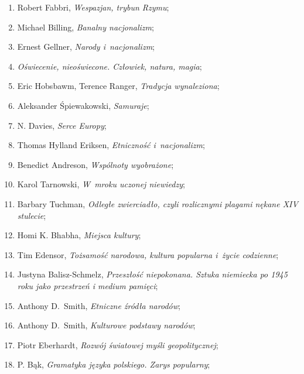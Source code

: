 \documentclass[a4paper,11pt]{article}
\begin{document}
\begin{enumerate}
\item Robert Fabbri, \emph{Wespazjan, trybun Rzymu};

\item Michael Billing, \emph{Banalny nacjonalizm};

\item Ernest Gellner, \emph{Narody i~nacjonalizm};

\item \emph{Oświecenie, nieoświecone. Człowiek, natura, magia};

\item Eric Hobsbawm, Terence Ranger, \emph{Tradycja wynaleziona};

\item Aleksander Śpiewakowski, \emph{Samuraje};

\item N. Davies, \emph{Serce Europy};

\item Thomas Hylland Eriksen, \emph{Etniczność i~nacjonalizm};

\item Benedict Andreson, \emph{Wspólnoty wyobrażone};

\item Karol Tarnowski, \emph{W~mroku uczonej niewiedzy};

\item Barbary Tuchman, \emph{Odległe zwierciadło, czyli rozlicznymi
    plagami nękane XIV stulecie};

\item Homi K. Bhabha, \emph{Miejsca kultury};

\item Tim Edensor, \emph{Tożsamość narodowa, kultura popularna i~życie
    codzienne};

\item Justyna Balisz-Schmelz, \emph{Przeszłość niepokonana. Sztuka
    niemiecka po 1945 roku jako przestrzeń i medium pamięci};

\item Anthony D.~Smith, \emph{Etniczne źródła narodów};

\item Anthony D.~Smith, \emph{Kulturowe podstawy narodów};

\item Piotr Eberhardt, \emph{Rozwój światowej myśli geopolitycznej};

\item P. Bąk, \emph{Gramatyka języka polskiego. Zarys popularny};


\end{enumerate}
\end{document}
